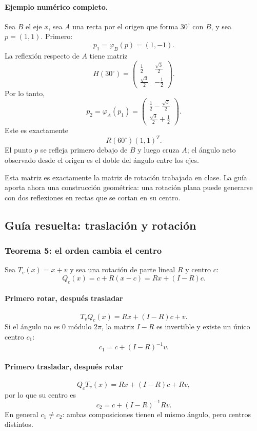 \paragraph{Ejemplo numérico completo.}
Sea \(B\) el eje \(x\), sea \(A\) una recta por el origen que forma \(30^\circ\) con \(B\),
y sea \(p=(1,1)\). Primero:
\[
  p_1=\varphi_B(p)=(1,-1).
\]
La reflexión respecto de \(A\) tiene matriz
\[
H(30^\circ)=
\begin{pmatrix}
\frac12&\frac{\sqrt3}{2}\\
\frac{\sqrt3}{2}&-\frac12
\end{pmatrix}.
\]
Por lo tanto,
\[
p_2=\varphi_A(p_1)
=
\begin{pmatrix}
\frac12-\frac{\sqrt3}{2}\\[1mm]
\frac{\sqrt3}{2}+\frac12
\end{pmatrix}.
\]
Este es exactamente
\[
R(60^\circ)(1,1)^T.
\]
El punto \(p\) se refleja primero debajo de \(B\) y luego cruza \(A\); el ángulo neto observado
desde el origen es el doble del ángulo entre los ejes.

\begin{idea}
Esta matriz es exactamente la matriz de rotación trabajada en clase. La guía aporta ahora
una construcción geométrica: una rotación plana puede generarse con dos reflexiones en
rectas que se cortan en su centro.
\end{idea}

\subsection{Guía resuelta: traslación y rotación}

\subsubsection{Teorema 5: el orden cambia el centro}

Sea \(T_v(x)=x+v\) y sea una rotación de parte lineal \(R\) y centro \(c\):
\[
  Q_c(x)=c+R(x-c)=Rx+(I-R)c.
\]

\paragraph*{Primero rotar, después trasladar}
\[
  T_vQ_c(x)=Rx+(I-R)c+v.
\]
Si el ángulo no es \(0\) módulo \(2\pi\), la matriz \(I-R\) es invertible y existe un único
centro \(c_1\):
\[
  \boxed{c_1=c+(I-R)^{-1}v}.
\]

\paragraph*{Primero trasladar, después rotar}
\[
  Q_cT_v(x)=Rx+(I-R)c+Rv,
\]
por lo que su centro es
\[
  \boxed{c_2=c+(I-R)^{-1}Rv}.
\]
En general \(c_1\neq c_2\): ambas composiciones tienen el mismo ángulo, pero centros distintos.

